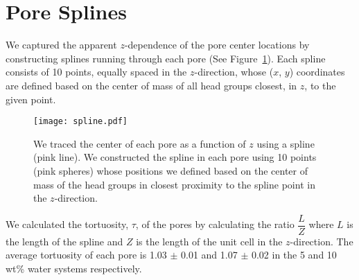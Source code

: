   \clearpage
  \section{Pore Splines}\label{S-section:splines}
  
  We captured the apparent $z$-dependence of the pore center locations by
  constructing splines running through each pore (See Figure~\ref{S-fig:spline}).
  Each spline consists of 10 points, equally spaced in the $z$-direction, whose
  ($x$, $y$) coordinates are defined based on the center of mass of all head
  groups closest, in $z$, to the given point.
  
  \begin{figure}[!htb]
  \centering
  \texttt{[image: spline.pdf]}
  \caption{We traced the center of each pore as a function of $z$ using a spline (pink
  line). We constructed the spline in each pore using 10 points (pink spheres) whose
  positions we defined based on the center of mass of the head groups in closest proximity
  to the spline point in the $z$-direction.}\label{S-fig:spline}
  \end{figure}
  
  We calculated the tortuosity, $\tau$, of the pores by calculating the 
  ratio $\dfrac{L}{Z}$ where $L$ is the length of the spline and $Z$ is 
  the length of the unit cell in the $z$-direction. The average tortuosity
  of each pore is 1.03 $\pm$ 0.01 and 1.07 $\pm$ 0.02 in the 5 and 10 wt\%
  water systems respectively.
  
